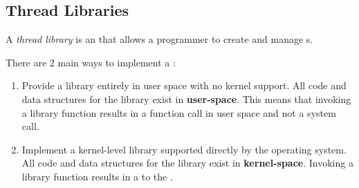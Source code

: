 \subsection{Thread Libraries}\label{subsec:Thread_Libraries}
\begin{definition}\label{def:Thread_Library}
  A \emph{thread library} is an  that allows a programmer to create and manage s.
\end{definition}

There are 2 main ways to implement a :
\begin{enumerate}[noitemsep]
\item Provide a library entirely in user space with no kernel support.
  All code and data structures for the library exist in \textbf{user-space}.
  This means that invoking a library function results in a function call in user space and not a system call.
\item Implement a kernel-level library supported directly by the operating system.
  All code and data structures for the library exist in \textbf{kernel-space}.
  Invoking a library function results in a  to the .
\end{enumerate}


